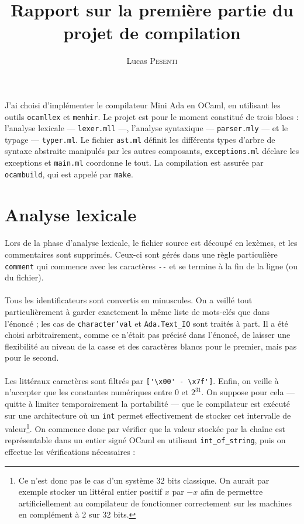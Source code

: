 \documentclass[a4paper,12pt]{article}
\title{Rapport sur la première partie du projet de compilation}
\author{Lucas \textsc{Pesenti}}
\date{}
\begin{document}
\maketitle
\paragraph*{}
J'ai choisi d'implémenter le compilateur Mini Ada en OCaml, en utilisant les
outils \texttt{ocamllex} et \texttt{menhir}. Le projet est pour le moment constitué de trois blocs : l'analyse lexicale --- \texttt{lexer.mll} ---, l'analyse syntaxique --- \texttt{parser.mly} --- et le typage --- \texttt{typer.ml}. Le fichier \texttt{ast.ml} définit les différents types d'arbre de syntaxe abstraite manipulés par les autres composants, \texttt{exceptions.ml} déclare les exceptions et \texttt{main.ml} coordonne le tout. La compilation est assurée par \texttt{ocambuild}, qui est appelé par \texttt{make}.

\section{Analyse lexicale}

\paragraph*{}
Lors de la phase d'analyse lexicale, le fichier source est découpé en lexèmes, et les commentaires sont supprimés. Ceux-ci sont gérés dans une règle particulière \texttt{comment} qui commence avec les caractères \texttt{-{}-} et se termine à la fin de la ligne (ou du fichier).

\paragraph*{}
Tous les identificateurs sont convertis en minuscules. On a veillé tout particulièrement à garder exactement la même liste de mots-clés que dans l'énoncé ; les cas de \texttt{character'val} et \texttt{Ada.Text\_IO} sont traités à part. Il a été choisi arbitrairement, comme ce n'était pas précisé dans l'énoncé, de laisser une flexibilité au niveau de la casse et des caractères blancs pour le premier, mais pas pour le second.

\paragraph*{}
Les littéraux caractères sont filtrés par \verb$['\x00' - \x7f']$. Enfin, on veille à n'accepter que les constantes numériques entre $0$ et $2^{31}$. On suppose pour cela --- quitte à limiter temporairement la portabilité --- que le compilateur est exécuté sur une architecture où un \texttt{int} permet effectivement de stocker cet intervalle de valeur\footnote{Ce n'est donc pas le cas d'un système 32 bits classique. On aurait par exemple stocker un littéral entier positif $x$ par $-x$ afin de permettre artificiellement au compilateur de fonctionner correctement sur les machines en complément à 2 sur 32 bits.}. On commence donc par vérifier que la valeur stockée par la chaîne est représentable dans un entier signé OCaml en utilisant  \texttt{int\_of\_string}, puis on effectue les vérifications nécessaires : 
\end{document}

